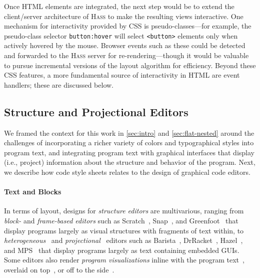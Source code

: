 \documentclass[acmsmall, screen]{acmart}
\newcommand{\parahead}[1]
  {\paragraph{\textbf{#1}}}
\newcommand{\hass}
{\textsc{Hass}}
\newcommand{\htmlTag}[1]
  {\texttt{<#1>}}
\begin{document}
Once HTML elements are integrated, the next step would be to extend the client/server architecture of \hass{} to make the resulting views interactive.
One mechanism for interactivity provided by CSS is pseudo-classes---for example, the pseudo-class selector \texttt{button:hover} will select \htmlTag{button} elements only when actively hovered by the mouse.
Browser events such as these could be detected and forwarded to the \hass{} server for re-rendering---though it would be valuable to pursue incremental versions of the layout algorithm for efficiency.
Beyond these CSS features, a more fundamental source of interactivity in HTML are event handlers; these are discussed below. 






\subsection{Structure and Projectional Editors}


We framed the context for this work in \autoref{sec:intro} and \autoref{sec:flat-nested} around the challenges of incorporating a richer variety of colors and typographical styles into program text, and integrating program text with graphical interfaces that display (i.e., project) information about the structure and behavior of the program.
Next, we describe how code style sheets relates to the design of graphical code editors. 









\parahead{Text and Blocks}



In terms of layout,
designs for \emph{structure editors} are multivarious, ranging from \emph{block-} and \emph{frame-based editors} such as Scratch~\citep{Resnick2009}, Snap~\citep{Snap}, and Greenfoot~\citep{Kolling2015} that display programs largely as visual structures with fragments of text within, to \emph{heterogeneous}~\citep{Erwig1995} and \emph{projectional}~\citep{Fowler08Projectional} editors such as Barista~\citep{Ko2006}, DrRacket~\citep{Andersen2020}, Hazel~\citep{Omar2021}, and MPS~\cite{MPS} that display programs largely as text containing embedded GUIs.
Some editors also render \emph{program visualizations} inline with the program text~\cite{Hoffswell2018, Prong, Rauch2019, Omar2021, MPS}, overlaid on top~\cite{Lerner2020}, or off to the side~\cite{Omnicode}.
\end{document}
